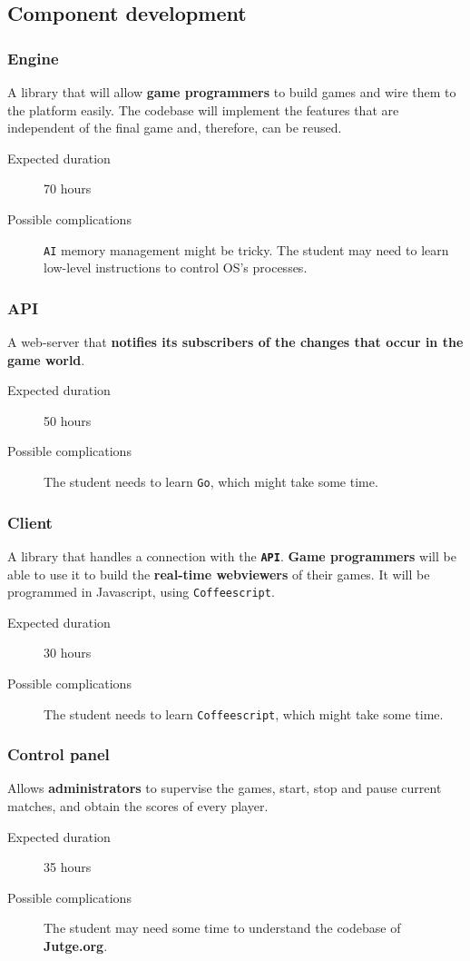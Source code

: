 \documentclass[a4paper,11pt,titlepage,abstract,numbers=noenddot,automark,mnsy,intlimits,rgb,dvipsnames]{report}
\begin{document}
\subsection{Component development}
\subsubsection{Engine}
A library that will allow \textbf{game programmers} to build games and wire them to the platform
easily. The codebase will implement the features that are independent of the final game and, therefore, can be reused.
\begin{description}
\item[Expected duration]
70 hours
\item[Possible complications]
\texttt{AI} memory management might be tricky.
  The student may need to learn low-level instructions to control OS's processes.
\end{description}
\subsubsection{API}
A web-server that \textbf{notifies its subscribers of the changes that occur in the game world}.
\begin{description}
\item[Expected duration]
50 hours
\item[Possible complications]
The student needs to learn \texttt{Go}, which might take some time.
\end{description}
\subsubsection{Client}
A library that handles a connection with the \textbf{\texttt{API}}. \textbf{Game programmers} will be able to use it to build
the \textbf{real-time webviewers} of their games. It will be programmed in \texttt{}Javascript\texttt{}, using \texttt{Coffeescript}.
\begin{description}
\item[Expected duration]
30 hours
\item[Possible complications]
The student needs to learn \texttt{Coffeescript}, which might take some time.
\end{description}
\subsubsection{Control panel}
Allows \textbf{administrators} to supervise the games, start, stop and pause current matches, and obtain the
scores of every player.
\begin{description}
\item[Expected duration]
35 hours
\item[Possible complications]
The student may need some time to understand the codebase of \textbf{Jutge.org}.
\end{description}
\end{document}
